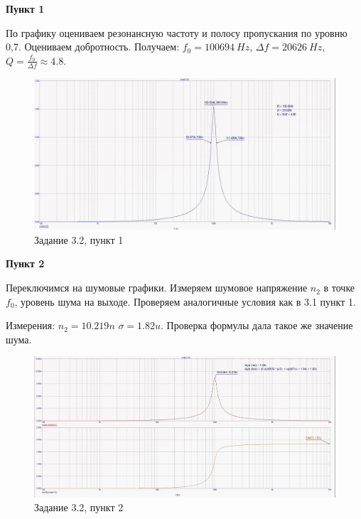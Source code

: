 \documentclass[a4paper, 14pt]{extarticle}%
\begin{document}
\textbf{Пункт 1}
\newline

По графику оцениваем резонансную частоту и полосу пропускания по уровню 0,7. Оцениваем добротность. Получаем:
\newline
$f_0 = 100694 \: Hz$, $\Delta f = 20626 \: Hz$, $Q = \frac{f_0}{\Delta f} \approx 4.8$.

\begin{figure}[h!]
			\centering
			\includegraphics[width=1.1\linewidth]{3/3_2_1.jpg}
			\caption{Задание 3.2, пункт 1}
			\label{A}
\end{figure}

\textbf{Пункт 2}
\newline

Переключимся на шумовые графики. Измеряем шумовое напряжение $n_2$ в точке $f_0$, уровень шума на выходе.
Проверяем аналогичные условия как в 3.1 пункт 1.

Измерения:
\newline
$n_2 = 10.219n$
\newline
$\sigma = 1.82u$.
\newline
Проверка формулы дала такое же значение шума.


\begin{figure}[h!]
			\centering
			\includegraphics[width=1.1\linewidth]{3/3_2_2.jpg}
			\caption{Задание 3.2, пункт 2}
			\label{A}
\end{figure}
\end{document}
